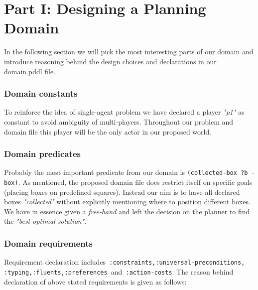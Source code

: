 \documentclass[letterpaper]{article} %
\begin{document}
\section{Part I: Designing a Planning Domain}
In the following section we will pick the most interesting parts of our domain and introduce reasoning behind the design choices and declarations in our domain.pddl file. 

\subsubsection{Domain constants}
To reinforce the idea of single-agent problem we have declared a player \emph{"p1"} as constant to avoid ambiguity of multi-players. Throughout our problem and domain file this player will be the only actor in our proposed world. 

\subsubsection{Domain predicates}
Probably the most important predicate from our domain is \texttt{(collected-box ?b -box)}. As mentioned, the proposed domain file does restrict itself on specific goals (placing boxes on predefined squares). Instead our aim is to have all declared boxes \emph{"collected"} without explicitly mentioning where to position different boxes. We have in essence given a \emph{free-hand} and left the decision on the planner to find the \emph{"best-optimal solution"}. 

\subsubsection{Domain requirements}
Requirement declaration includes\texttt{ :constraints,:universal-preconditions, :typing,:fluents,:preferences }and\texttt{ :action-costs}. The reason behind declaration of above stated requirements is given as follows:
\end{document}
